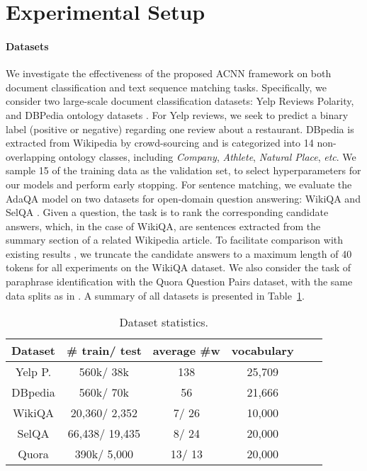\documentclass[11pt,a4paper]{article}
\begin{document}
\section{Experimental Setup}
\paragraph{Datasets}
We investigate the effectiveness of the proposed ACNN framework on both document classification and text sequence matching tasks. Specifically, we consider two large-scale document classification datasets: Yelp Reviews Polarity, and DBPedia ontology datasets \citep{zhang2015character}. For Yelp reviews, we seek to predict a binary label (positive or negative) regarding one review about a restaurant. DBpedia is extracted from Wikipedia by crowd-sourcing and is categorized into 14 non-overlapping ontology classes, including \emph{Company}, \emph{Athlete}, \emph{Natural Place}, \emph{etc}. We sample 15 of the training data as the validation set, to select hyperparameters for our models and perform early stopping. 
For sentence matching, we evaluate the AdaQA model on two datasets for open-domain question answering: WikiQA \citep{yang2015wikiqa} and SelQA \citep{jurczyk2016selqa}. Given a question, the task is to rank the corresponding candidate answers, which, in the case of WikiQA, are sentences extracted from the summary section of a related Wikipedia article. 
To facilitate comparison with existing results \citep{yin2015abcnn,yang2015wikiqa, Shen2018BaselineNM}, we truncate the candidate answers to a maximum length of 40 tokens for all experiments on the WikiQA dataset.
We also consider the task of paraphrase identification with the Quora Question Pairs dataset, with the same data splits as in \cite{wang2017bilateral}. 
A summary of all datasets is presented in Table~\ref{tab:summary}.

\begin{table}[t!] \small
\centering
\begin{tabular}{cccccc}
\toprule[1.2pt]
		\textbf{Dataset} & \textbf{\# \textbf{train}/ \textbf{test}} & \textbf{average \#w} & \textbf{vocabulary} \\
		\hline
		Yelp P.       &  560k/ 38k & 138 & 25,709  \\
		DBpedia         & 560k/ 70k & 56 &  21,666 \\
		\hline 
		WikiQA       &  20,360/ 2,352 & 7/ 26 & 10,000  \\
		SelQA         & 66,438/ 19,435 & 8/ 24 &  20,000 \\
		Quora       & 390k/ 5,000 & 13/ 13 & 20,000  \\
		\bottomrule[1.2pt]
	\end{tabular}
	\vspace{-3mm}
	\caption{\small Dataset statistics.}
	\label{tab:summary}
	\vspace{-4mm}
\end{table}
\end{document}
